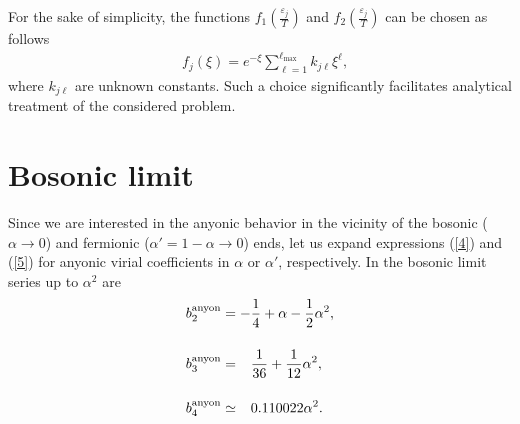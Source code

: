\documentclass[12pt,a4paper]{article}
\def\eps{\varepsilon}
\begin{document}
For the sake of simplicity, the functions $f_1(\frac{\eps_{j}}{T})$ and $f_2(\frac{\eps_{j}}{T})$ can be chosen as follows
\begin{align}\label{eq:f_xi}
&f_j(\xi)=e^{-\xi}\sum_{\ell=1}^{\ell_{\max}}k_{j\ell}\xi^\ell,
\end{align}
where $k_{j\ell}$ are unknown constants. Such a choice significantly facilitates analytical treatment of the considered problem.


\section{Bosonic limit}\label{sec:bosonic}
Since we are interested in the anyonic behavior in the vicinity of the bosonic ($\alpha\rightarrow0$) and fermionic ($\alpha'=1-\alpha\rightarrow0$) ends, let us expand expressions (\ref{4}) and (\ref{5}) for anyonic virial coefficients in $\alpha$ or $\alpha'$, respectively. In the bosonic limit series up to $\alpha^2$ are
\begin{align}
&b_2^{\rm anyon} = -\frac14 + \alpha - \frac12 \alpha^2,\\[12pt]
&b_3^{\rm anyon} = \phantom{-}
\frac{1}{36} + \frac{1}{12} \alpha^2,\\[12pt]
&b_4^{\rm anyon} \simeq \phantom{-}0.110022 \alpha^2.
\end{align}
\end{document}
